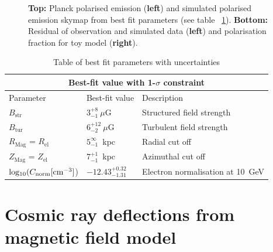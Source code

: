 \documentclass[usenatbib]{mnras}
\begin{document}
\begin{figure}
\caption{\textbf{Top:} Planck polarised emission (\textbf{left}) and simulated polarised emission skymap from best fit parameters (see table ~\ref{Para_table}). \textbf{Bottom:} Residual of observation and simulated data (\textbf{left}) and polarisation fraction for toy model (\textbf{right}).}
\label{fig:Skymaps}
\end{figure}



\begin{table}
\centering
\caption{Table of best fit parameters with uncertainties}
\begin{tabular}{ |p{}|p{4.5cm}|p{6.5cm}|  }
\hline
\multicolumn{3}{|c|}{Best-fit value with 1-$\sigma$ constraint} \\
\hline
Parameter & Best-fit value &Description \\
\hline
\hline
$B_{\mathrm{str}} $& $3_{-1}^{+8} ~ \mu$G & Structured field strength \\
\hline
$B_{\mathrm{tur}} $& $ 6_{-2}^{+12} ~\mu$G & Turbulent field strength\\
\hline
$R_{\mathrm{Mag}}$ = $R_{\mathrm{el}}$ & $5_{-1}^{\infty}$~kpc & Radial cut off \\
\hline
$Z_{\mathrm{Mag}}$ = $Z_{\mathrm{el}}$ & $7_{-1}^{+1}$~kpc & Azimuthal cut off\\
\hline
\rule{0pt}{3ex} 
${\rm{log_{10}}}(C_{\rm norm} [{\rm cm}^{-3}]$) & ${-12.43}_{{-1.31}}^{{+0.32}}$ & Electron normalisation at 10~GeV\\
\hline
\end{tabular}
\label{Para_table}
\end{table}

\section{Cosmic ray deflections from magnetic field model}
\label{Deflections}
\end{document}
